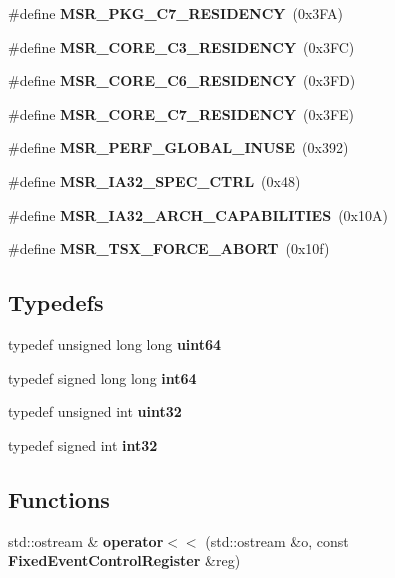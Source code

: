 \begin{DoxyCompactItemize}
\#define {\bfseries M\+S\+R\+\_\+\+P\+K\+G\+\_\+\+C7\+\_\+\+R\+E\+S\+I\+D\+E\+N\+CY}~(0x3\+F\+A)
\item 
\mbox{\label{types_8h_a0ebfd4e08ba05ea086c2b62a65962800}} 
\#define {\bfseries M\+S\+R\+\_\+\+C\+O\+R\+E\+\_\+\+C3\+\_\+\+R\+E\+S\+I\+D\+E\+N\+CY}~(0x3\+F\+C)
\item 
\mbox{\label{types_8h_a469d53b8d39927c4789bdb2ed12dcd8c}} 
\#define {\bfseries M\+S\+R\+\_\+\+C\+O\+R\+E\+\_\+\+C6\+\_\+\+R\+E\+S\+I\+D\+E\+N\+CY}~(0x3\+F\+D)
\item 
\mbox{\label{types_8h_aa809d05086aa9345a20960e502e4935d}} 
\#define {\bfseries M\+S\+R\+\_\+\+C\+O\+R\+E\+\_\+\+C7\+\_\+\+R\+E\+S\+I\+D\+E\+N\+CY}~(0x3\+F\+E)
\item 
\mbox{\label{types_8h_a01e72f0f136b2f2f22d30dc83a3070b5}} 
\#define {\bfseries M\+S\+R\+\_\+\+P\+E\+R\+F\+\_\+\+G\+L\+O\+B\+A\+L\+\_\+\+I\+N\+U\+SE}~(0x392)
\item 
\mbox{\label{types_8h_a273ab4542fb12f8cd9796463f271bb7b}} 
\#define {\bfseries M\+S\+R\+\_\+\+I\+A32\+\_\+\+S\+P\+E\+C\+\_\+\+C\+T\+RL}~(0x48)
\item 
\mbox{\label{types_8h_a0fe4d63a4838f20f6ce45461142d0591}} 
\#define {\bfseries M\+S\+R\+\_\+\+I\+A32\+\_\+\+A\+R\+C\+H\+\_\+\+C\+A\+P\+A\+B\+I\+L\+I\+T\+I\+ES}~(0x10\+A)
\item 
\mbox{\label{types_8h_affeb5b7f215bab594f990cd45fbb9c71}} 
\#define {\bfseries M\+S\+R\+\_\+\+T\+S\+X\+\_\+\+F\+O\+R\+C\+E\+\_\+\+A\+B\+O\+RT}~(0x10f)
\end{DoxyCompactItemize}
\subsection*{Typedefs}
\begin{DoxyCompactItemize}
\item 
\mbox{\label{types_8h_a29940ae63ec06c9998bba873e25407ad}} 
typedef unsigned long long {\bfseries uint64}
\item 
\mbox{\label{types_8h_a87dc1c46a17e3ee6037afdb6aef76632}} 
typedef signed long long {\bfseries int64}
\item 
\mbox{\label{types_8h_a1134b580f8da4de94ca6b1de4d37975e}} 
typedef unsigned int {\bfseries uint32}
\item 
\mbox{\label{types_8h_a43d43196463bde49cb067f5c20ab8481}} 
typedef signed int {\bfseries int32}
\end{DoxyCompactItemize}
\subsection*{Functions}
\begin{DoxyCompactItemize}
\item 
\mbox{\label{types_8h_ade23d63e7c0dd811d32fe7634735c043}} 
std\+::ostream \& {\bfseries operator$<$$<$} (std\+::ostream \&o, const \textbf{ Fixed\+Event\+Control\+Register} \&reg)
\end{DoxyCompactItemize}


